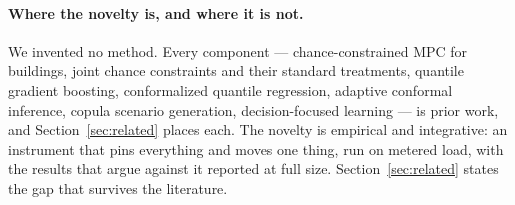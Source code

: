 \paragraph{Where the novelty is, and where it is not.} We invented no method.
Every component --- chance-constrained MPC for buildings, joint chance
constraints and their standard treatments, quantile gradient boosting,
conformalized quantile regression, adaptive conformal inference, copula
scenario generation, decision-focused learning --- is prior work, and
Section~\ref{sec:related} places each. The novelty is empirical and
integrative: an instrument that pins everything and moves one thing, run on
metered load, with the results that argue against it reported at full size.
Section~\ref{sec:related} states the gap that survives the literature.
